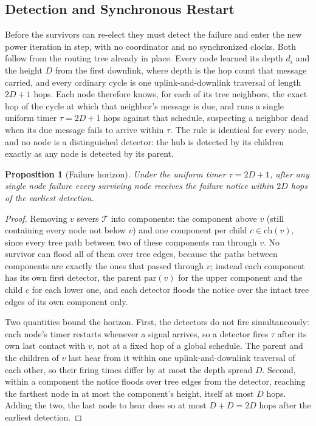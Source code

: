 \documentclass[letterpaper]{article} %
\newtheorem{proposition}{Proposition}
\begin{document}
\subsection{Detection and Synchronous Restart}
\label{sec:ft-detect}

Before the survivors can re-elect they must detect the failure and enter the new
power iteration in step, with no coordinator and no synchronized clocks. Both
follow from the routing tree already in place. Every node learned its depth $d_i$
and the height $D$ from the first downlink, where depth is the hop count that
message carried, and every ordinary cycle is one uplink-and-downlink traversal of
length $2D+1$ hops. Each node therefore knows, for each of its tree neighbors, the
exact hop of the cycle at which that neighbor's message is due, and runs a single
uniform timer $\tau = 2D+1$ hops against that schedule, suspecting a neighbor dead
when its due message fails to arrive within $\tau$. The rule is identical for
every node, and no node is a distinguished detector: the hub is detected by its
children exactly as any node is detected by its parent.

\begin{proposition}[Failure horizon]
\label{prop:horizon}
Under the uniform timer $\tau = 2D+1$, after any single node failure every surviving node receives the failure notice within $2D$ hops of the earliest detection.
\end{proposition}

\begin{proof}
Removing $v$ severs $\mathcal{T}$ into components: the component above $v$ (still
containing every node not below $v$) and one component per child
$c\in\mathrm{ch}(v)$, since every tree path between two of these components ran
through $v$. No survivor can flood all of them over tree edges, because the paths
between components are exactly the ones that passed through $v$; instead each
component has its own first detector, the parent $\mathrm{par}(v)$ for the upper
component and the child $c$ for each lower one, and each detector floods the
notice over the intact tree edges of its own component only.

Two quantities bound the horizon. First, the detectors do not fire
simultaneously: each node's timer restarts whenever a signal arrives, so a
detector fires $\tau$ after its own last contact with $v$, not at a fixed hop
of a global schedule. The parent and the children of $v$ last hear from it
within one uplink-and-downlink traversal of each other, so their firing times
differ by at most the depth spread $D$. Second, within a component the notice
floods over tree edges from the detector, reaching the farthest node in at
most the component's height, itself at most $D$ hops. Adding the two, the last
node to hear does so at most $D + D = 2D$ hops after the earliest detection.
\end{proof}
\end{document}
